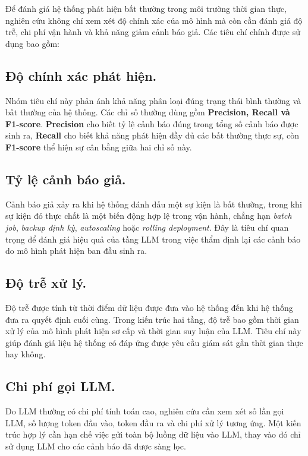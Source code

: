Để đánh giá hệ thống phát hiện bất thường trong môi trường thời gian thực, nghiên cứu không chỉ xem xét độ chính xác của mô hình mà còn cần đánh giá độ trễ, chi phí vận hành và khả năng giảm cảnh báo giả. Các tiêu chí chính được sử dụng bao gồm:

\subsection*{Độ chính xác phát hiện.} 
Nhóm tiêu chí này phản ánh khả năng phân loại đúng trạng thái bình thường và bất thường của hệ thống. Các chỉ số thường dùng gồm \textbf{Precision, Recall và F1-score}.\textbf{ Precision} cho biết tỷ lệ cảnh báo đúng trong tổng số cảnh báo được sinh ra, \textbf{Recall} cho biết khả năng phát hiện đầy đủ các bất thường thực sự, còn \textbf{F1-score} thể hiện sự cân bằng giữa hai chỉ số này.

\subsection*{Tỷ lệ cảnh báo giả.} 
Cảnh báo giả xảy ra khi hệ thống đánh dấu một sự kiện là bất thường, trong khi sự kiện đó thực chất là một biến động hợp lệ trong vận hành, chẳng hạn \textit{batch job}, \textit{backup định kỳ}, \textit{autoscaling} hoặc \textit{rolling deployment}. Đây là tiêu chí quan trọng để đánh giá hiệu quả của tầng LLM trong việc thẩm định lại các cảnh báo do mô hình phát hiện ban đầu sinh ra.

\subsection*{Độ trễ xử lý.} 
Độ trễ được tính từ thời điểm dữ liệu được đưa vào hệ thống đến khi hệ thống đưa ra quyết định cuối cùng. Trong kiến trúc hai tầng, độ trễ bao gồm thời gian xử lý của mô hình phát hiện sơ cấp và thời gian suy luận của LLM. Tiêu chí này giúp đánh giá liệu hệ thống có đáp ứng được yêu cầu giám sát gần thời gian thực hay không.

\subsection*{Chi phí gọi LLM.} 
Do LLM thường có chi phí tính toán cao, nghiên cứu cần xem xét số lần gọi LLM, số lượng token đầu vào, token đầu ra và chi phí xử lý tương ứng. Một kiến trúc hợp lý cần hạn chế việc gửi toàn bộ luồng dữ liệu vào LLM, thay vào đó chỉ sử dụng LLM cho các cảnh báo đã được sàng lọc.

